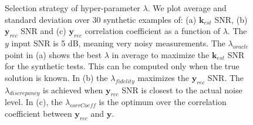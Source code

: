 \documentclass[]{elsarticle} %
\begin{document}
\begin{figure}[H]
    \caption{Selection strategy of hyper-parameter $\lambda$. We plot average and standard deviation over 30 synthetic examples of: (a) $\textbf{k}_{est}$ SNR, (b) $\textbf{y}_{rec}$ SNR and (c) $\textbf{y}_{rec}$ correlation coefficient as a function of $\lambda$.  The $y$ input SNR is 5 dB, meaning very noisy measurements. The $\lambda_{oracle}$ point in (a) shows the best $\lambda$ in average to maximize the $\textbf{k}_{est}$ SNR for the synthetic tests. This can be computed only when the true solution is known. In (b) the $\lambda_{fidelity}$ maximizes the $\textbf{y}_{rec}$ SNR. The $\lambda_{discrepancy}$ is achieved when $\textbf{y}_{rec}$ SNR is closest to the actual noise level. In (c), the $\lambda_{corrCoeff}$ is the optimum over the correlation coefficient between $\textbf{y}_{rec}$ and $\textbf{y}$.}
    \label{fig_SNR_lambdas_5}
\end{figure}
\end{document}
